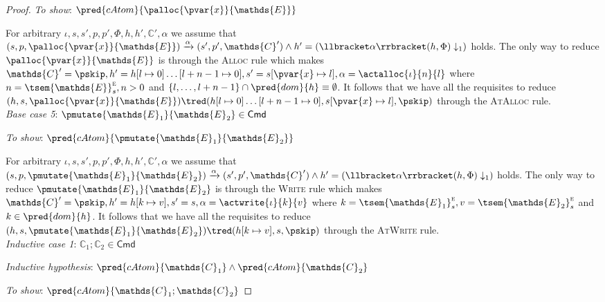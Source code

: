 \begin{lem}
{\begin{proof}
	\textit{To show}: $\pred{cAtom}{\palloc{\pvar{x}}{\mathds{E}}}$
	
	For arbitrary $\iota, s, s', p, p', \Phi, h, h', \mathds{C}', \alpha$ we assume that $(s, p, \palloc{\pvar{x}}{\mathds{E}}) \xrightarrow{\alpha} (s', p', \mathds{C}') \land h' = \left( \llbracket \alpha \rrbracket(h, \Phi) \downarrow_1 \right)$ holds. The only way to reduce $\palloc{\pvar{x}}{\mathds{E}}$ is through the \textsc{Alloc} rule which makes $\mathds{C}' = \pskip, h' = h[l \mapsto 0]\ldots[l + n - 1 \mapsto 0], s' = s[\pvar{x} \mapsto l], \alpha = \actalloc{\iota}{n}{l}$ where $n = \tsem{\mathds{E}}_s^\textsc{e}, n > 0$ and $\{ l, \ldots, l + n - 1\} \cap \pred{dom}{h} \equiv \emptyset$. It follows that we have all the requisites to reduce $(h, s, \palloc{\pvar{x}}{\mathds{E}}) \tred (h[l \mapsto 0]\ldots[l + n - 1 \mapsto 0], s[\pvar{x} \mapsto l], \pskip)$ through the \textsc{AtAlloc} rule. \\
	\indline
	\textit{Base case 5}: $\pmutate{\mathds{E}_1}{\mathds{E}_2} \in \mathsf{Cmd}$
	
	\textit{To show}: $\pred{cAtom}{\pmutate{\mathds{E}_1}{\mathds{E}_2}}$
	
	For arbitrary $\iota, s, s', p, p', \Phi, h, h', \mathds{C}', \alpha$ we assume that $(s, p, \pmutate{\mathds{E}_1}{\mathds{E}_2}) \xrightarrow{\alpha} (s', p', \mathds{C}') \land h' = \left( \llbracket \alpha \rrbracket(h, \Phi) \downarrow_1 \right)$ holds. The only way to reduce $\pmutate{\mathds{E}_1}{\mathds{E}_2}$ is through the \textsc{Write} rule which makes $\mathds{C}' = \pskip, h' = h[k \mapsto v], s' = s, \alpha = \actwrite{\iota}{k}{v}$ where $k = \tsem{\mathds{E}_1}_s^\textsc{e}, v = \tsem{\mathds{E}_2}_s^\textsc{e}$ and $k \in \pred{dom}{h}$. It follows that we have all the requisites to reduce $(h, s, \pmutate{\mathds{E}_1}{\mathds{E}_2}) \tred (h[k \mapsto v], s, \pskip)$ through the \textsc{AtWrite} rule. \\
	\indline
	\textit{Inductive case 1}: $\mathds{C}_1 ; \mathds{C}_2 \in \mathsf{Cmd}$
	
	\textit{Inductive hypothesis}: $\pred{cAtom}{\mathds{C}_1} \land \pred{cAtom}{\mathds{C}_2}$
	
	\textit{To show}: $\pred{cAtom}{\mathds{C}_1 ; \mathds{C}_2}$
	

\end{proof}}
\end{lem}
